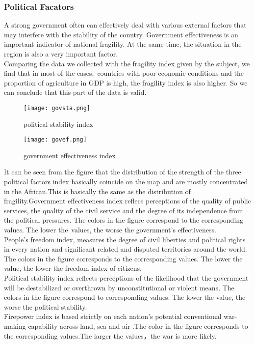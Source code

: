 \documentclass{mcmthesis}
\begin{document}
\subsubsection{Political Facators}
A strong government often can effectively deal with various external factors that may interfere with the stability of the country. Government effectiveness is an important indicator of national fragility. At the same time, the situation in the region is also a very important factor.\\
Comparing the data we collected with the fragility index given by the subject, we find that in most of the cases, countries with poor economic conditions and the proportion of agriculture in GDP is high, the fragility index is also higher. So we can conclude that this part of the data is valid.\\
\begin{figure}[h]
  \centering
  \begin{minipage}[h]{0.48\textwidth}
  \centering
  \texttt{[image: govsta.png]}
  \caption{political stability index}
  \end{minipage}
  \begin{minipage}[h]{0.48\textwidth}
  \centering
  \texttt{[image: govef.png]}
  \caption{government effectiveness index}
  \end{minipage}
\end{figure}
It can be seen from the figure that the distribution of the strength of the three political factors index basically coincide on the map and are mostly concentrated in the African.This is basically the same as the distribution of fragility.Government effectiveness index reflecs perceptions of the quality of public services, the quality of the civil service and the degree of its independence from the political pressures. The colors in the figure correspond to the corresponding values. The lower the values, the worse the government’s effectiveness.\\
People's freedom index, measures the degree of civil liberties and political rights in every nation and significant related and disputed territories around the world. The colors in the figure corresponds to the corresponding values. The lower the value, the lower the freedom index of citizens.\\
Political stability index reflects perceptions of the likelihood that the government will be destabilized or overthrown by unconstitutional or violent means. The colors in the figure correspond to corresponding values. The lower the value, the worse the political stability.\\
Firepower index is based strictly on each nation's potential conventional war-making capability across land, sea and air .The color in the figure corresponds to the corresponding values.The larger the values，the war is more likely.
\end{document}
